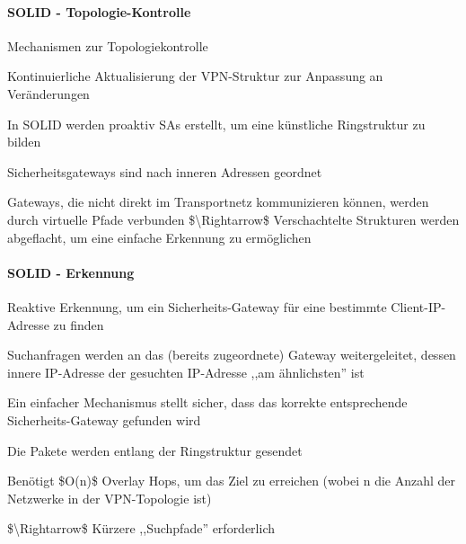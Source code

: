\documentclass[a4paper]{article}
\begin{document}
\begin{multicols}{3}
\begin{itemize*}
            \paragraph{SOLID -
                  Topologie-Kontrolle}
            \begin{itemize*}
                  \item       Mechanismen zur Topologiekontrolle
                  \begin{itemize*}
                        \item Kontinuierliche Aktualisierung der VPN-Struktur zur Anpassung an Veränderungen
                  \end{itemize*}
                  \item       In SOLID werden proaktiv SAs erstellt, um eine künstliche Ringstruktur
                  zu bilden
                  \item       Sicherheitsgateways sind nach inneren Adressen geordnet
                  \item       Gateways, die nicht direkt im Transportnetz kommunizieren können,
                  werden durch virtuelle Pfade verbunden \$\textbackslash Rightarrow\$
                  Verschachtelte Strukturen werden abgeflacht, um eine einfache
                  Erkennung zu ermöglichen
            \end{itemize*}

            \paragraph{SOLID - Erkennung}
            \begin{itemize*}
                  \item       Reaktive Erkennung, um ein Sicherheits-Gateway für eine bestimmte
                  Client-IP-Adresse zu finden
                  \item       Suchanfragen werden an das (bereits zugeordnete) Gateway
                  weitergeleitet, dessen innere IP-Adresse der gesuchten IP-Adresse ,,am
                  ähnlichsten'' ist
                  \begin{itemize*}
                        \item Ein einfacher Mechanismus stellt sicher, dass das korrekte entsprechende Sicherheits-Gateway gefunden wird
                        \item Die Pakete werden entlang der Ringstruktur gesendet
                        \item Benötigt \$O(n)\$ Overlay Hops, um das Ziel zu erreichen (wobei n die Anzahl der Netzwerke in der VPN-Topologie ist)
                  \end{itemize*}
                  \item       \$\textbackslash Rightarrow\$ Kürzere ,,Suchpfade'' erforderlich
            \end{itemize*}


\end{itemize*}
\end{multicols}
\end{document}
